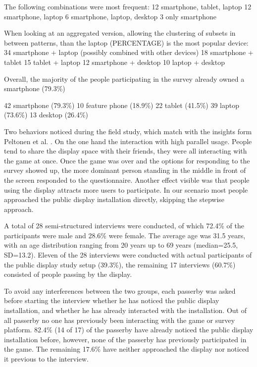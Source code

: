 	The following combinations were most frequent:
		12	smartphone, tablet, laptop
		12	smartphone, laptop
		6 	smartphone, laptop, desktop
		3 	only smartphone

	When looking at an aggregated version, allowing the clustering of subsets in between patterns, than the laptop (PERCENTAGE) is the most popular device:
		34 	smartphone + laptop (possibly combined with other devices)
		18	smartphone + tablet
		15	tablet + laptop
		12	smartphone + desktop
		10 	laptop + desktop

	Overall, the majority of the people participating in the survey already owned a smartphone (79.3\%)

		42	smartphone (79.3\%)
		10	feature phone (18.9\%)
		22	tablet (41.5\%)
		39	laptop (73.6\%)
		13	desktop (26.4\%)



Two behaviors noticed during the field study, which match with the insights form Peltonen et al. \cite{peltonen2008s}. On the one hand the interaction with high parallel usage. People tend to share the display space with their friends, they were all interacting with the game at once. Once the game was over and the options for responding to the survey showed up, the more dominant person standing in the middle in front of the screen responded to the questionnaire. Another effect visible was that people using the display attracts more users to participate.
In our scenario most people approached the public display installation directly, skipping the stepwise approach.



A total of 28 semi-structured interviews were conducted, of which 72.4\% of the participants were male and 28.6\% were female. The average age was 31.5 years, with an age distribution ranging from 20 years up to 69 years (median=25.5, SD=13.2). Eleven of the 28 interviews were conducted with actual participants of the public display study setup (39.3\%), the remaining 17 interviews (60.7\%) consisted of people passing by the display. 

To avoid any interferences between the two groups, each passerby was asked before starting the interview whether he has noticed the public display installation, and whether he has already interacted with the installation. Out of all passerby no one has previously been interacting with the game or survey platform. 82.4\% (14 of 17) of the passerby have already noticed the public display installation before, however, none of the passerby has previously participated in the game. The remaining 17.6\% have neither approached the display nor noticed it previous to the interview. 

